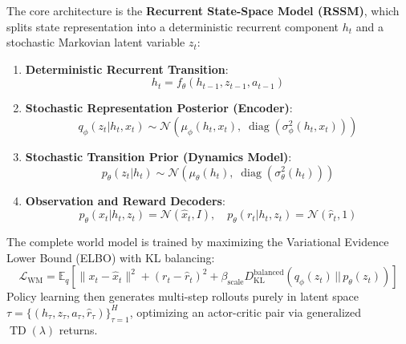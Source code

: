 \documentclass[11pt,a4paper]{article}
\theoremstyle{definition}
\begin{document}
The core architecture is the \textbf{Recurrent State-Space Model (RSSM)}, which splits state representation into a deterministic recurrent component $h_t$ and a stochastic Markovian latent variable $z_t$:
\begin{enumerate}
    \item \textbf{Deterministic Recurrent Transition}:
    {\boldmath
    \begin{equation}
    h_t = f_\theta(h_{t-1}, z_{t-1}, a_{t-1})
    \end{equation}
    }
    \item \textbf{Stochastic Representation Posterior (Encoder)}:
    {\boldmath
    \begin{equation}
    q_\phi(z_t | h_t, x_t) \sim \mathcal{N}\left( \mu_\phi(h_t, x_t), \; \operatorname{diag}(\sigma_\phi^2(h_t, x_t)) \right)
    \end{equation}
    }
    \item \textbf{Stochastic Transition Prior (Dynamics Model)}:
    {\boldmath
    \begin{equation}
    p_\theta(z_t | h_t) \sim \mathcal{N}\left( \mu_\theta(h_t), \; \operatorname{diag}(\sigma_\theta^2(h_t)) \right)
    \end{equation}
    }
    \item \textbf{Observation and Reward Decoders}:
    {\boldmath
    \begin{equation}
    p_\theta(x_t | h_t, z_t) = \mathcal{N}(\hat{x}_t, I), \quad p_\theta(r_t | h_t, z_t) = \mathcal{N}(\hat{r}_t, 1)
    \end{equation}
    }
\end{enumerate}
The complete world model is trained by maximizing the Variational Evidence Lower Bound (ELBO) with KL balancing:
{\boldmath
\begin{equation}
\mathcal{L}_{\text{WM}} = \mathbb{E}_q \left[ \|x_t - \hat{x}_t\|^2 + (r_t - \hat{r}_t)^2 + \beta_{\text{scale}} D_{\text{KL}}^{\text{balanced}}(q_\phi(z_t) \,||\, p_\theta(z_t)) \right]
\end{equation}
}
Policy learning then generates multi-step rollouts purely in latent space $\tau = \{(h_\tau, z_\tau, a_\tau, \hat{r}_\tau)\}_{\tau=1}^H$, optimizing an actor-critic pair via generalized $\operatorname{TD}(\lambda)$ returns.
\end{document}
